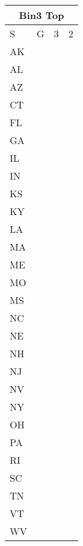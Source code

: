 \documentclass{article}
\begin{document}
\hspace{1em}
\begin{tabular}[t]{ll|l|l}
\multicolumn{4}{c}{\textbf{Bin3 Top}} \\
\toprule
S  & G               & 3               & 2               \\ \midrule
AK & \cellcolor{red} & \cellcolor{red} & \cellcolor{red} \\
AL & \cellcolor{red} & \cellcolor{red} & \cellcolor{red} \\
AZ & \cellcolor{red} & \cellcolor{red} & \cellcolor{red} \\
CT & \cellcolor{red} & \cellcolor{red} & \cellcolor{red} \\
FL & \cellcolor{red} & \cellcolor{red} & \cellcolor{red} \\
GA & \cellcolor{red} & \cellcolor{red} & \cellcolor{red} \\
IL & \cellcolor{red} & \cellcolor{red} & \cellcolor{red} \\
IN & \cellcolor{red} & \cellcolor{red} & \cellcolor{red} \\
KS & \cellcolor{red} & \cellcolor{red} & \cellcolor{red} \\
KY & \cellcolor{red} & \cellcolor{red} & \cellcolor{red} \\
LA & \cellcolor{red} & \cellcolor{red} & \cellcolor{red} \\
MA & \cellcolor{red} & \cellcolor{red} & \cellcolor{red} \\
ME & \cellcolor{red} & \cellcolor{red} & \cellcolor{red} \\
MO & \cellcolor{red} & \cellcolor{red} & \cellcolor{red} \\
MS & \cellcolor{red} & \cellcolor{red} & \cellcolor{red} \\
NC & \cellcolor{red} & \cellcolor{red} & \cellcolor{red} \\
NE & \cellcolor{red} & \cellcolor{red} & \cellcolor{red} \\
NH & \cellcolor{red} & \cellcolor{red} & \cellcolor{red} \\
NJ & \cellcolor{red} & \cellcolor{red} & \cellcolor{red} \\
NV & \cellcolor{red} & \cellcolor{red} & \cellcolor{red} \\
NY & \cellcolor{red} & \cellcolor{red} & \cellcolor{red} \\
OH & \cellcolor{red} & \cellcolor{red} & \cellcolor{red} \\
PA & \cellcolor{red} & \cellcolor{red} & \cellcolor{red} \\
RI & \cellcolor{red} & \cellcolor{red} & \cellcolor{red} \\
SC & \cellcolor{red} & \cellcolor{red} & \cellcolor{red} \\
TN & \cellcolor{red} & \cellcolor{red} & \cellcolor{red} \\
VT & \cellcolor{red} & \cellcolor{red} & \cellcolor{red} \\
WV & \cellcolor{red} & \cellcolor{red} & \cellcolor{red} \\ \bottomrule
\end{tabular}
\end{document}
